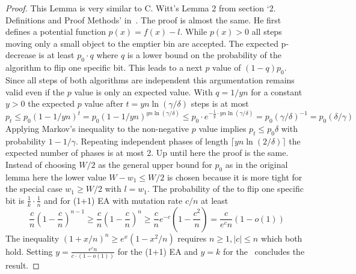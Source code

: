 \begin{proof}
    This Lemma is very similar to C. Witt's  Lemma 2 from section `2. Definitions and Proof Methods' in~\cite{witt2005worst}.
    The proof is almost the same.
    He first defines a potential function $p(x)=f(x)-l$.
    While $p(x)>0$ all steps moving only a small object to the emptier bin are accepted.
    The expected p-decrease is at least $p_0\cdot q$ where $q$ is a lower bound on the probability of the algorithm to flip one specific bit.
    This leads to a next $p$ value of $(1-q)p_0$.
    Since all steps of both algorithms are independent this argumentation remains valid even if the $p$ value is only an expected value.
    With $q=1/yn$ for a constant $y>0$ the expected $p$ value after $t=yn\ln(\gamma/\delta)$ steps is at most
    \[p_t\le p_0{(1-1/yn)}^t=p_0{(1-1/yn)}^{yn\ln(\gamma/\delta)}\le p_0\cdot e^{-\frac{1}{y}\cdot yn\ln(\gamma/\delta)}=p_0{(\gamma/\delta)}^{-1} = p_0(\delta/\gamma)\]
    Applying Markov's inequality to the non-negative $p$ value implies $p_t\le p_0\delta$ with probability $1-1/\gamma$.
    Repeating independent phases of length $\lceil yn\ln(2/\delta)\rceil$ the expected number of phases is at most 2.
    Up until here the proof is the same.\newline
    Instead of choosing $W/2$ as the general upper bound for $p_0$ as in the original lemma here the lower value $W-w_1\le W/2$ is chosen because it is more tight for the special case $w_1\ge W/2$ with $l=w_1$.
    The probability of the \RLSR[k] to flip one specific bit is \(\frac{1}{k}\cdot\frac{1}{n}\) and for (1+1) EA with mutation rate $c/n$ at least
    \[
        \frac{c}{n}{(1-\frac{c}{n})}^{n-1}
        \ge \frac{c}{n}{(1-\frac{c}{n})}^{n}
        \ge \frac{c}{n}e^{-c}(1-\frac{c^2}{n})
        = \frac{c}{e^c n}(1-o(1))
    \]
    The inequality \({(1+x/n)}^n\ge e^x (1-{x^2}/n)\) requires $n\ge1, |c|\le n$ which both hold.
    Setting $y=\frac{e^c n}{c\cdot(1-o(1))}$ for the (1+1) EA and $y=k$ for the \RLSR~concludes the result.
\end{proof}

